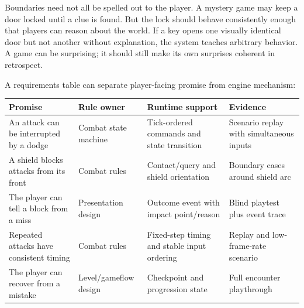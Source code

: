 Boundaries need not all be spelled out to the player. A mystery game may keep a door locked until a clue is found. But the lock should behave consistently enough that players can reason about the world. If a key opens one visually identical door but not another without explanation, the system teaches arbitrary behavior. A game can be surprising; it should still make its own surprises coherent in retrospect.

A requirements table can separate player-facing promise from engine mechanism:

{\def\LTcaptype{none} %
\begin{longtable}[]{@{}
  >{\raggedright\arraybackslash}p{}
  >{\raggedright\arraybackslash}p{}
  >{\raggedright\arraybackslash}p{}
  >{\raggedright\arraybackslash}p{}@{}}
\toprule\noalign{}
\begin{minipage}[b]{\linewidth}\raggedright
Promise
\end{minipage} & \begin{minipage}[b]{\linewidth}\raggedright
Rule owner
\end{minipage} & \begin{minipage}[b]{\linewidth}\raggedright
Runtime support
\end{minipage} & \begin{minipage}[b]{\linewidth}\raggedright
Evidence
\end{minipage} \\
\midrule\noalign{}
\endhead
\bottomrule\noalign{}
\endlastfoot
An attack can be interrupted by a dodge & Combat state machine & Tick-ordered commands and state transition & Scenario replay with simultaneous inputs \\
A shield blocks attacks from its front & Combat rules & Contact/query and shield orientation & Boundary cases around shield arc \\
The player can tell a block from a miss & Presentation design & Outcome event with impact point/reason & Blind playtest plus event trace \\
Repeated attacks have consistent timing & Combat rules & Fixed-step timing and stable input ordering & Replay and low-frame-rate scenario \\
The player can recover from a mistake & Level/gameflow design & Checkpoint and progression state & Full encounter playthrough \\
\end{longtable}
}

